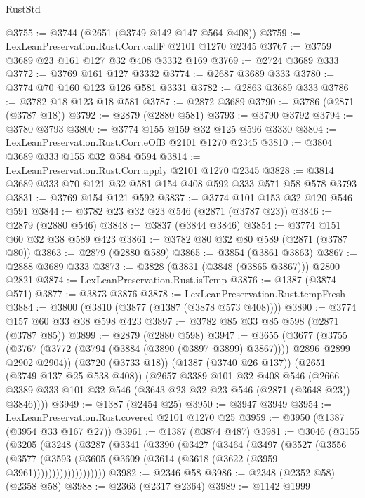 \begin{lexlean}{RustStd}
\begin{coremodule}
@3755 := @3744 (@2651 (@3749 @142 @147 @564 @408))
@3759 := LexLeanPreservation.Rust.Corr.callF @2101 @1270 @2345
@3767 := @3759 @3689 @23 @161 @127 @32 @408 @3332 @169
@3769 := @2724 @3689 @333
@3772 := @3769 @161 @127 @3332
@3774 := @2687 @3689 @333
@3780 := @3774 @70 @160 @123 @126 @581 @3331
@3782 := @2863 @3689 @333
@3786 := @3782 @18 @123 @18 @581
@3787 := @2872 @3689
@3790 := @3786 (@2871 (@3787 @18))
@3792 := @2879 (@2880 @581)
@3793 := @3790 @3792
@3794 := @3780 @3793
@3800 := @3774 @155 @159 @32 @125 @596 @3330
@3804 := LexLeanPreservation.Rust.Corr.eOfB @2101 @1270 @2345
@3810 := @3804 @3689 @333 @155 @32 @584 @594
@3814 := LexLeanPreservation.Rust.Corr.apply @2101 @1270 @2345
@3828 := @3814 @3689 @333 @70 @121 @32 @581 @154 @408 @592 @333 @571 @58 @578 @3793
@3831 := @3769 @154 @121 @592
@3837 := @3774 @101 @153 @32 @120 @546 @591
@3844 := @3782 @23 @32 @23 @546 (@2871 (@3787 @23))
@3846 := @2879 (@2880 @546)
@3848 := @3837 (@3844 @3846)
@3854 := @3774 @151 @60 @32 @38 @589 @423
@3861 := @3782 @80 @32 @80 @589 (@2871 (@3787 @80))
@3863 := @2879 (@2880 @589)
@3865 := @3854 (@3861 @3863)
@3867 := @2888 @3689 @333
@3873 := @3828 (@3831 (@3848 (@3865 @3867))) @2800 @2821
@3874 := LexLeanPreservation.Rust.isTemp
@3876 := @1387 (@3874 @571)
@3877 := @3873 @3876
@3878 := LexLeanPreservation.Rust.tempFresh
@3884 := @3800 (@3810 (@3877 (@1387 (@3878 @573 @408))))
@3890 := @3774 @157 @60 @33 @38 @598 @423
@3897 := @3782 @85 @33 @85 @598 (@2871 (@3787 @85))
@3899 := @2879 (@2880 @598)
@3947 := @3655
    (@3677
      (@3755 (@3767 (@3772 (@3794 (@3884 (@3890 (@3897 @3899) @3867)))) @2896 @2899 @2902 @2904))
      (@3720 (@3733 @18))
      (@1387 (@3740 @26 @137))
      (@2651 (@3749 @137 @25 @538 @408))
      (@2657
        @3389
        @101
        @32
        @408
        @546
        (@2666 @3389 @333 @101 @32 @546 (@3643 @23 @32 @23 @546 (@2871 (@3648 @23)) @3846))))
@3949 := @1387 (@2454 @25)
@3950 := @3947 @3949
@3954 := LexLeanPreservation.Rust.covered @2101 @1270 @25
@3959 := @3950 (@1387 (@3954 @33 @167 @27))
@3961 := @1387 (@3874 @487)
@3981 := @3046
    (@3155
      (@3205
        (@3248
          (@3287
            (@3341
              (@3390
                (@3427
                  (@3464
                    (@3497
                      (@3527
                        (@3556
                          (@3577
                            (@3593
                              (@3605 (@3609 (@3614 (@3618 (@3622 (@3959 @3961)))))))))))))))))))
@3982 := @2346 @58
@3986 := @2348 (@2352 @58) (@2358 @58)
@3988 := @2363 (@2317 @2364)
@3989 := @1142 @1999

\end{coremodule}
\end{lexlean}
